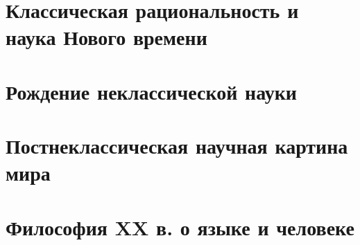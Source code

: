 \documentclass[a4paper, 12pt, notitlepage]{report}
\begin{document}
\chapter{Классическая рациональность и наука Нового времени}



\chapter{Рождение неклассической науки}




\chapter{Постнеклассическая научная картина мира}



\chapter{Философия XX в. о языке и человеке}


%
\end{document}
